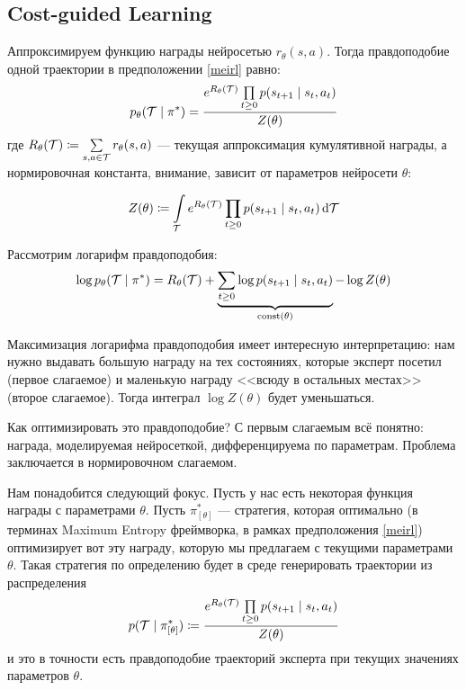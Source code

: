 \subsection{Cost-guided Learning}

Аппроксимируем функцию награды нейросетью $r_\theta(s, a)$. Тогда правдоподобие одной траектории в предположении \eqref{meirl} равно:
$$p_\theta(\mathcal{T} \mid \pi^*) = \frac{e^{R_{\theta}(\mathcal{T})} \prod\limits_{t \ge 0}p(s_{t+1} \mid s_t, a_t)}{Z(\theta)}$$
где $R_{\theta}(\mathcal{T}) \coloneqq \sum\limits_{s, a \in \mathcal{T}} r_{\theta}(s, a)$ --- текущая аппроксимация кумулятивной награды, а нормировочная константа, внимание, зависит от параметров нейросети $\theta$:

\begin{equation}\label{irl_partionfunction}
Z(\theta) \coloneqq \int\limits_{\mathcal{T}} e^{R_{\theta}(\mathcal{T})} \prod_{t \ge 0}p(s_{t+1} \mid s_t, a_t) \mathop{}\!\mathrm{d} \mathcal{T}
\end{equation}

Рассмотрим логарифм правдоподобия:
\begin{equation}\label{irl_loglikelihood}
\log p_\theta(\mathcal{T} \mid \pi^*) = R_{\theta}(\mathcal{T}) + \underbrace{\sum_{t \ge 0} \log p(s_{t+1} \mid s_t, a_t)}_{\operatorname{const}(\theta)} - \log Z(\theta)
\end{equation}

Максимизация логарифма правдоподобия имеет интересную интерпретацию: нам нужно выдавать большую награду на тех состояниях, которые эксперт посетил (первое слагаемое) и маленькую награду <<всюду в остальных местах>> (второе слагаемое). Тогда интеграл $\log Z(\theta)$ будет уменьшаться.

Как оптимизировать это правдоподобие? С первым слагаемым всё понятно: награда, моделируемая нейросеткой, дифференцируема по параметрам. Проблема заключается в нормировочном слагаемом.

Нам понадобится следующий фокус. Пусть у нас есть некоторая функция награды с параметрами $\theta$. Пусть $\pi^*_{[\theta]}$ --- стратегия, которая оптимально (в терминах Maximum Entropy фреймворка, в рамках предположения \eqref{meirl}) оптимизирует вот эту награду, которую мы предлагаем с текущими параметрами $\theta$. Такая стратегия по определению будет в среде генерировать траектории из распределения
\begin{equation}\label{irl_currentoptimalpolicy}
p(\mathcal{T} \mid \pi^*_{[\theta]}) \coloneqq \frac{e^{R_{\theta}(\mathcal{T})} \prod\limits_{t \ge 0}p(s_{t+1} \mid s_t, a_t)}{Z(\theta)}
\end{equation}
и это в точности есть правдоподобие траекторий эксперта при текущих значениях параметров $\theta$.

